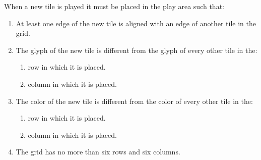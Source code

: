 \documentclass[a4paper, 10pt, notumble]{leaflet}
\begin{document}
When a new tile is played it must be placed in the play area such that:
\begin{enumerate}
  \item At least one edge of the new tile is aligned with an edge of another tile in the grid.
  \item The glyph of the new tile is different from the glyph of every other tile in the:
  \begin{enumerate}
  	\item row in which it is placed.
    	\item column in which it is placed.
  \end{enumerate}
  \item The color of the new tile is different from the color of every other tile in the:
  \begin{enumerate}
  	\item row in which it is placed.
    \item column in which it is placed.
  \end{enumerate}
  \item The grid has no more than six rows and six columns.
\end{enumerate}

\newpage
\end{document}
